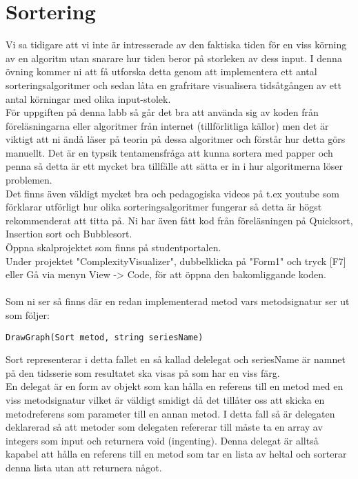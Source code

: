 \documentclass{article}
\begin{document}
   
\section*{Sortering}
Vi sa tidigare att vi inte är intresserade av den faktiska tiden för en viss körning av en algoritm utan snarare hur tiden beror på storleken av dess input. I denna övning kommer ni att få utforska detta genom att implementera ett antal sorteringsalgoritmer och sedan låta en grafritare visualisera tidsåtgången av ett antal körningar med olika input-stolek. \\För uppgiften på denna labb så går det bra att använda sig av koden från föreläsningarna eller algoritmer från internet (tillförlitliga källor) men det är viktigt att ni ändå läser på teorin på dessa algoritmer och förstår hur detta görs manuellt. Det är en typsik tentamensfråga att kunna sortera med papper och penna så detta är ett mycket bra tillfälle att sätta er in i hur algoritmerna löser problemen. \\Det finns även väldigt mycket bra och pedagogiska videos på t.ex youtube som förklarar utförligt hur olika sorteringsalgoritmer fungerar så detta är högst rekommenderat att titta på. Ni har även fått kod från föreläsningen på Quicksort, Insertion sort och Bubblesort. \\

Öppna skalprojektet som finns på studentportalen. \\Under projektet "ComplexityVisualizer", dubbelklicka på "Form1" och tryck [F7] eller Gå via menyn View -> Code, för att öppna den bakomliggande koden.\\ \\
Som ni ser så finns där en redan implementerad metod vars metodsignatur ser ut som följer: 
\begin{lstlisting}
DrawGraph(Sort metod, string seriesName) 
\end{lstlisting}

Sort representerar i detta fallet en så kallad delelegat och seriesName är namnet på den tidsserie som resultatet ska visas på som har en viss färg.\\

En delegat är en form av objekt som kan hålla en referens till en metod med en viss metodsignatur vilket är väldigt smidigt då det tillåter oss att skicka en metodreferens som parameter till en annan metod. 
I detta fall så är delegaten deklarerad så att metoder som delegaten refererar till måste ta en array av integers som input och returnera void (ingenting). Denna delegat är alltså kapabel att hålla en referens till en metod som tar en lista av heltal och sorterar denna lista utan att returnera något.
\end{document}
